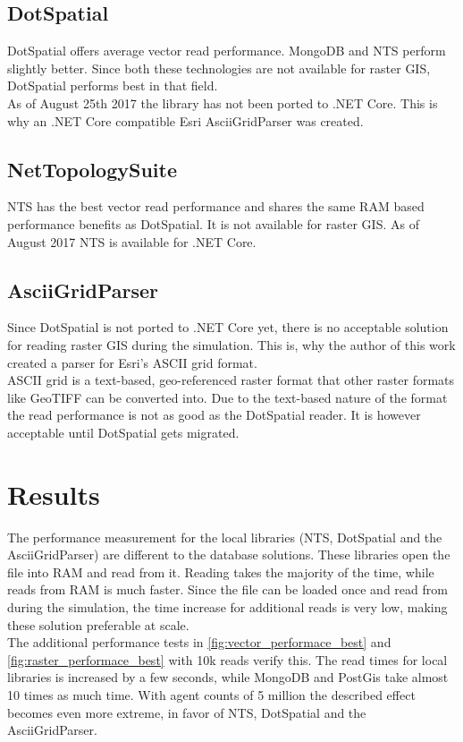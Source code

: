 \subsection{DotSpatial}
DotSpatial offers average vector read performance. MongoDB and NTS perform slightly better. Since both these technologies are not available for raster GIS, DotSpatial performs best in that field.\\
As of August 25th 2017 the library has not been ported to .NET Core. This is why an .NET Core compatible Esri AsciiGridParser was created.\\


\subsection{NetTopologySuite}
NTS has the best vector read performance and shares the same RAM based performance benefits as DotSpatial. It is not available for raster GIS. As of August 2017 NTS is available for .NET Core.\\


\subsection{AsciiGridParser}
Since DotSpatial is not ported to .NET Core yet, there is no acceptable solution for reading raster GIS during the simulation. This is, why the author of this work created a parser for Esri's ASCII grid format.\\
ASCII grid is a text-based, geo-referenced raster format that other raster formats like GeoTIFF can be converted into. Due to the text-based nature of the format the read performance is not as good as the DotSpatial reader. It is however acceptable until DotSpatial gets migrated.



\section{Results}
The performance measurement for the local libraries (NTS, DotSpatial and the AsciiGridParser) are different to the database solutions. These libraries open the file into RAM and read from it. Reading takes the majority of the time, while reads from RAM is much faster. Since the file can be loaded once and read from during the simulation, the time increase for additional reads is very low, making these solution preferable at scale.\\
The additional performance tests in \ref{fig:vector_performace_best} and \ref{fig:raster_performace_best} with 10k reads verify this. The read times for local libraries is increased by a few seconds, while MongoDB and PostGis take almost 10 times as much time. With agent counts of 5 million the described effect becomes even more extreme, in favor of NTS, DotSpatial and the AsciiGridParser.

